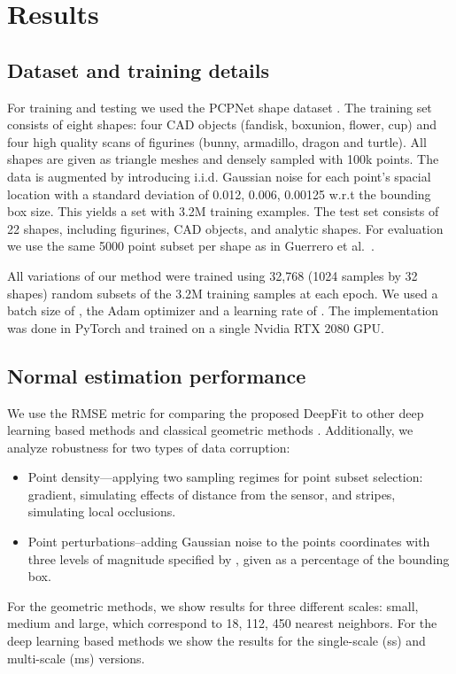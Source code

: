 \section{Results}
\label{Sec:results}

\subsection{Dataset and training details} 
For training and testing we used the PCPNet shape dataset \cite{guerrero2018pcpnet}. The training set consists of eight shapes: four CAD objects (fandisk, boxunion, flower, cup) and four high quality scans of figurines (bunny, armadillo, dragon and turtle). All shapes are given as triangle meshes and densely sampled with 100k points. The data is augmented by introducing i.i.d. Gaussian noise for each point's spacial location with a standard deviation of  0.012, 0.006, 0.00125 w.r.t the bounding box size. This yields a set with 3.2M training examples. The test set consists of 22 shapes, including figurines, CAD objects, and analytic shapes. For evaluation we use the same 5000 point subset per shape as in Guerrero et al.~\cite{guerrero2018pcpnet}.

All variations of our method were trained using 32,768 (1024 samples by 32 shapes) random subsets of the 3.2M training samples at each epoch. We used a batch size of , the Adam optimizer and a learning rate of . The implementation was done in PyTorch and trained on a single Nvidia RTX 2080 GPU.

\subsection{Normal estimation performance}
\label{SubSec:results:baseline_n_est}

 We use the RMSE metric for comparing the proposed DeepFit to other deep learning based methods \cite{guerrero2018pcpnet,ben2019nesti,lenssen2019differentiable} and classical geometric methods \cite{hoppe1992surface,cazals2005estimating}. 
 Additionally, we analyze robustness for two types of data corruption: 
\begin{itemize}
    \item  Point density---applying two sampling regimes for point subset selection: gradient, simulating effects of distance from the sensor, and stripes, simulating local occlusions.    
    \item Point perturbations--adding Gaussian noise to the points coordinates with three levels of magnitude specified by , given as a percentage of the bounding box.
\end{itemize}
For the geometric methods, we show results for three different scales: small, medium and large, which correspond to 18, 112, 450 nearest neighbors. For the deep learning based methods we show the results for the single-scale (ss) and multi-scale (ms) versions.

